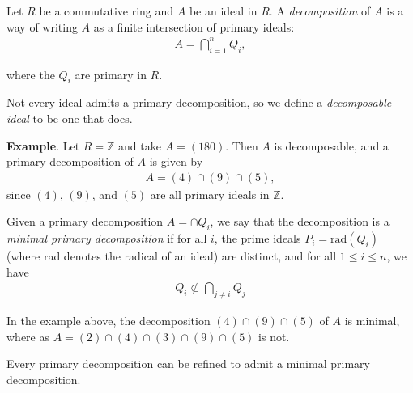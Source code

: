 \documentclass[12pt]{article}
\newcommand{\mb}{\mathbb}
\newcommand{\Z}{\mb{Z}}
\newcommand{\<}{\langle}
\renewcommand{\>}{\rangle}
\begin{document}
Let $R$ be a commutative ring and $A$ be an ideal in $R$.  A \emph{ decomposition} of $A$ is a way of writing $A$ as a finite intersection of primary ideals:
\begin{align*}
A=\bigcap_{i=1}^n Q_i,
\end{align*}

where the $Q_i$ are primary in $R$.

Not every ideal admits a primary decomposition, so we define a \emph{decomposable ideal} to be one that does.

\textbf{Example}.  Let $R=\Z$ and take $A=(180)$.  Then $A$ is decomposable, and a primary decomposition of $A$ is given by 
\begin{align*}
A=(4)\cap (9)\cap (5),
\end{align*}
since $(4)$, $(9)$, and $(5)$ are all primary ideals in $\Z$.

Given a primary decomposition $A=\cap Q_i$, we say that the decomposition is a \emph{minimal primary decomposition} if for all $i$, the prime ideals $P_i=\text{rad}(Q_i)$ (where rad denotes the radical of an ideal) are distinct, and for all $1\leq i\leq n$, we have
\begin{align*}
Q_i\not\subset \bigcap_{j\neq i} Q_j
\end{align*}

In the example above, the decomposition $(4)\cap (9)\cap (5)$ of $A$ is minimal, where as $A=(2)\cap (4) \cap (3) \cap (9) \cap (5)$ is not.

Every primary decomposition can be refined to admit a minimal primary decomposition.
\end{document}
